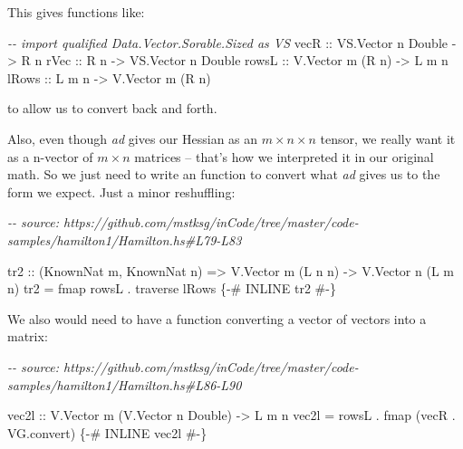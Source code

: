 \documentclass[]{article}
\newenvironment{Shaded}{}{}
\newcommand{\CommentTok}[1]{\textcolor[rgb]{0.38,0.63,0.69}{\textit{#1}}}
\newcommand{\DataTypeTok}[1]{\textcolor[rgb]{0.56,0.13,0.00}{#1}}
\newcommand{\FunctionTok}[1]{\textcolor[rgb]{0.02,0.16,0.49}{#1}}
\newcommand{\NormalTok}[1]{#1}
\newcommand{\OperatorTok}[1]{\textcolor[rgb]{0.40,0.40,0.40}{#1}}
\newcommand{\OtherTok}[1]{\textcolor[rgb]{0.00,0.44,0.13}{#1}}
\begin{document}
This gives functions like:

\begin{Shaded}
\begin{Highlighting}[]
\CommentTok{{-}{-} import qualified Data.Vector.Sorable.Sized as VS}
\OtherTok{vecR  ::} \DataTypeTok{VS.Vector}\NormalTok{ n }\DataTypeTok{Double} \OtherTok{{-}>} \DataTypeTok{R}\NormalTok{ n}
\OtherTok{rVec  ::} \DataTypeTok{R}\NormalTok{ n                }\OtherTok{{-}>} \DataTypeTok{VS.Vector}\NormalTok{ n }\DataTypeTok{Double}
\OtherTok{rowsL ::} \DataTypeTok{V.Vector}\NormalTok{ m (}\DataTypeTok{R}\NormalTok{ n)   }\OtherTok{{-}>} \DataTypeTok{L}\NormalTok{ m n}
\OtherTok{lRows ::} \DataTypeTok{L}\NormalTok{ m n              }\OtherTok{{-}>} \DataTypeTok{V.Vector}\NormalTok{ m (}\DataTypeTok{R}\NormalTok{ n)}
\end{Highlighting}
\end{Shaded}

to allow us to convert back and forth.

Also, even though \emph{ad} gives our Hessian as an \(m \times n \times n\)
tensor, we really want it as a n-vector of \(m \times n\) matrices -- that's how
we interpreted it in our original math. So we just need to write an function to
convert what \emph{ad} gives us to the form we expect. Just a minor reshuffling:

\begin{Shaded}
\begin{Highlighting}[]
\CommentTok{{-}{-} source: https://github.com/mstksg/inCode/tree/master/code{-}samples/hamilton1/Hamilton.hs\#L79{-}L83}

\OtherTok{tr2 ::}\NormalTok{ (}\DataTypeTok{KnownNat}\NormalTok{ m, }\DataTypeTok{KnownNat}\NormalTok{ n)}
    \OtherTok{=>} \DataTypeTok{V.Vector}\NormalTok{ m (}\DataTypeTok{L}\NormalTok{ n n)}
    \OtherTok{{-}>} \DataTypeTok{V.Vector}\NormalTok{ n (}\DataTypeTok{L}\NormalTok{ m n)}
\NormalTok{tr2 }\OtherTok{=} \FunctionTok{fmap}\NormalTok{ rowsL }\OperatorTok{.} \FunctionTok{traverse}\NormalTok{ lRows}
\OtherTok{\{{-}\# INLINE tr2 \#{-}\}}
\end{Highlighting}
\end{Shaded}

We also would need to have a function converting a vector of vectors into a
matrix:

\begin{Shaded}
\begin{Highlighting}[]
\CommentTok{{-}{-} source: https://github.com/mstksg/inCode/tree/master/code{-}samples/hamilton1/Hamilton.hs\#L86{-}L90}

\NormalTok{vec2l}
\OtherTok{    ::} \DataTypeTok{V.Vector}\NormalTok{ m (}\DataTypeTok{V.Vector}\NormalTok{ n }\DataTypeTok{Double}\NormalTok{)}
    \OtherTok{{-}>} \DataTypeTok{L}\NormalTok{ m n}
\NormalTok{vec2l }\OtherTok{=}\NormalTok{ rowsL }\OperatorTok{.} \FunctionTok{fmap}\NormalTok{ (vecR }\OperatorTok{.}\NormalTok{ VG.convert)}
\OtherTok{\{{-}\# INLINE vec2l \#{-}\}}
\end{Highlighting}
\end{Shaded}
\end{document}
